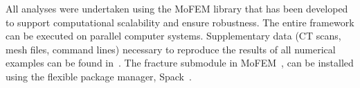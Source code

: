\documentclass[onecolumn]{svjour3}
\begin{document}
All analyses were undertaken using the MoFEM library \cite{mofemJoss2020} that has been developed to support computational scalability and ensure robustness. 
The entire framework can be executed on parallel computer systems. Supplementary data (CT scans, mesh files, command lines) 
necessary to reproduce the results of all numerical examples can be found in~\cite{karol_lewandowski_2019_dataset}. 
The fracture submodule in MoFEM~\cite{mofemJoss2020}, can be installed using the flexible package manager, Spack~\cite{spack2015}. 


%
%


\end{document}
